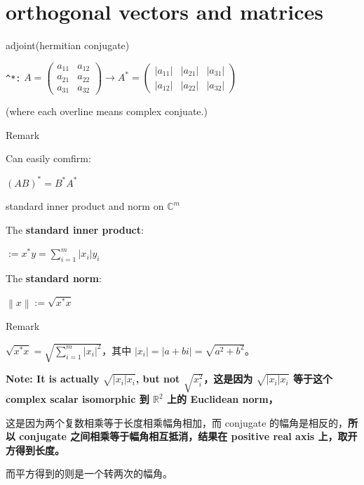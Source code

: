 \chapter{orthogonal vectors and matrices}

\begin{definition}{adjoint(hermitian conjugate)}

\texttt{\^{}*:} \(A = \begin{pmatrix}
a_{11} & a_{12} \\
a_{21} & a_{22} \\
a_{31} & a_{32}
\end{pmatrix}\rightarrow A^{\ast} = \begin{pmatrix}
\left| a_{11} \right| & \left| a_{21} \right| & \left| a_{31} \right| \\
\left| a_{12} \right| & \left| a_{22} \right| & \left| a_{32} \right|
\end{pmatrix}\)

(where each overline means complex conjuate.)

\end{definition}

\begin{qlremark}{Remark}

Can easily comfirm:

\(\left( {AB} \right)^{\ast} = B^{\ast}A^{\ast}\)

\end{qlremark}

\begin{definition}{standard inner product and norm on \(\mathbb{C}^{m}\)}

The \textbf{standard inner product}:

\(< x,y > := x^{\ast}y = \sum_{i = 1}^{m}\left| x_{i} \right|y_{i}\)

The \textbf{standard norm}:

\(\left\| x \right\| := \sqrt{x^{\ast}x}\)

\end{definition}

\begin{qlremark}{Remark}

\(\sqrt{x^{\ast}x} = \sqrt{\sum_{i = 1}^{m}\left| x_{i} \right|^{2}}\)，其中 \(\left| x_{i} \right| = \left| {a + bi} \right| = \sqrt{a^{2} + b^{2}}\)。

\textbf{Note: It is actually \(\sqrt{\left| x_{i} \right|x_{i}}\), but not \(\sqrt{x_{i}^{2}}\)，这是因为 \(\sqrt{\left| x_{i} \right|x_{i}}\) 等于这个 complex scalar isomorphic 到 \(\mathbb{R}^{2}\) 上的 Euclidean norm，}

这是因为两个复数相乘等于长度相乘幅角相加，而 conjugate 的幅角是相反的，\textbf{所以 conjugate 之间相乘等于幅角相互抵消，结果在 positive real axis 上，取开方得到长度。}

而平方得到的则是一个转两次的幅角。

\end{qlremark}

